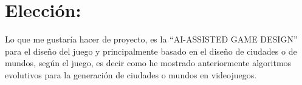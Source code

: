 \begin{table}[hpb]

\begin{center}
\end{center}
\caption{Figure of ''A Panorama of Artificial and Computational Intelligence in Games'' by
Georgios N. Yannakakis, Member, IEEE, and Julian Togelius, Member, IEEE} \label{Tabla2}
\end{table}





\section{Elección:}

Lo que me gustaría hacer de proyecto, es la “AI-ASSISTED GAME DESIGN” para el diseño del juego y principalmente basado en el diseño de ciudades o de mundos, según el juego, es decir como he mostrado anteriormente algoritmos evolutivos para la generación de ciudades o mundos en videojuegos.\\